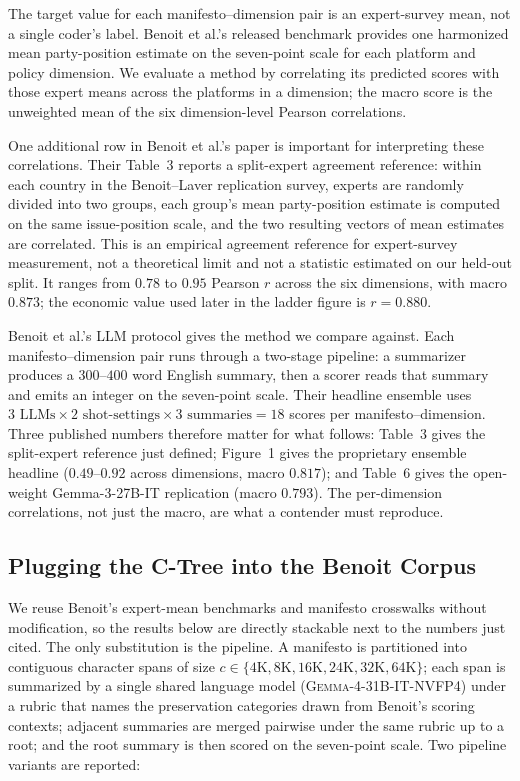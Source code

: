 The target value for each manifesto--dimension pair is an expert-survey
mean, not a single coder's label. Benoit et al.'s released benchmark
provides one harmonized mean party-position estimate on the seven-point
scale for each platform and policy dimension. We evaluate a method by
correlating its predicted scores with those expert means across the
platforms in a dimension; the macro score is the unweighted mean of the
six dimension-level Pearson correlations.

One additional row in Benoit et al.'s paper is important for interpreting
these correlations. Their Table~3 reports a split-expert agreement
reference: within each country in the Benoit--Laver replication survey,
experts are randomly divided into two groups, each group's mean
party-position estimate is computed on the same issue-position scale,
and the two resulting vectors of mean estimates are correlated. This is
an empirical agreement reference for expert-survey measurement, not a
theoretical limit and not a statistic estimated on our held-out
split. It ranges from $0.78$ to $0.95$ Pearson $r$ across the six
dimensions, with macro $0.873$; the economic value used later in the
ladder figure is $r = 0.880$.

Benoit et al.'s LLM protocol gives the method we compare against. Each
manifesto--dimension pair runs through a two-stage pipeline: a summarizer
produces a $300$--$400$ word English summary, then a scorer reads that
summary and emits an integer on the seven-point scale. Their headline
ensemble uses
$3 \text{ LLMs} \times 2 \text{ shot-settings} \times 3 \text{ summaries}
= 18$ scores per manifesto--dimension. Three published numbers therefore
matter for what follows: Table~3 gives the split-expert reference just
defined; Figure~1 gives the proprietary ensemble headline ($0.49$--$0.92$
across dimensions, macro $0.817$); and Table~6 gives the open-weight
Gemma-3-27B-IT replication (macro $0.793$). The per-dimension
correlations, not just the macro, are what a contender must reproduce.

\subsection{Plugging the C-Tree into the Benoit Corpus}

We reuse Benoit's expert-mean benchmarks and manifesto crosswalks
without modification, so the results below are directly stackable next
to the numbers just cited. The only substitution is the pipeline. A
manifesto is partitioned into contiguous character spans of size
$c\in\{4\mathrm{K},8\mathrm{K},16\mathrm{K},24\mathrm{K},32\mathrm{K},64\mathrm{K}\}$;
each span is summarized by a single shared language model
(\textsc{Gemma-4-31B-IT-NVFP4}) under a rubric that names the
preservation categories drawn from Benoit's scoring contexts; adjacent
summaries are merged pairwise under the same rubric up to a root;
and the root summary is then scored on the seven-point scale. Two
pipeline variants are reported:

